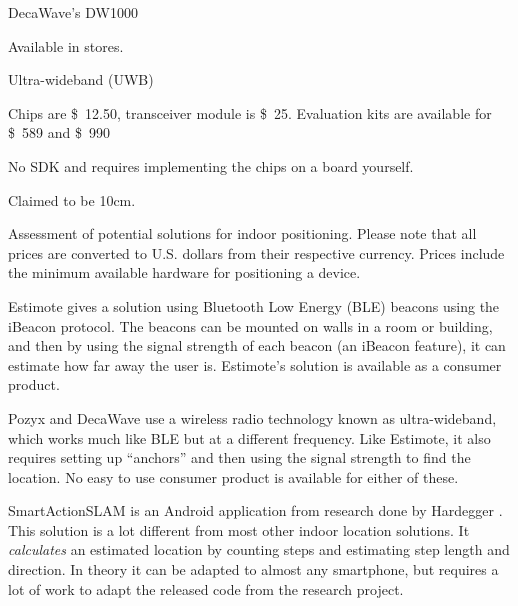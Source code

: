 \begin{table}[!htb]
\begin{description}[style=multiline,leftmargin=2.5cm]
        \item[Product:] DecaWave's DW1000 \cite{decawave}
        \item[Availability:] Available in stores. 
        \item[Technology:] Ultra-wideband (UWB)
        \item[Price:] Chips are \SI{12.50}[\$]{}, transceiver module is \SI{25}[\$]{}. Evaluation kits are available for \SI{589}[\$]{} and \SI{990}[\$]{} 
        \item[Ease of use:] No SDK and requires implementing the chips on a board yourself. 
        \item[Accuracy:] Claimed to be 10cm. 
        \end{description}
    \caption{Assessment of potential solutions for indoor positioning. Please note that all prices are converted to U.S. dollars from their respective currency. Prices include the minimum available hardware for positioning a device.}
    \label{tbl:indoor-positioning}
\end{table}

Estimote gives a solution using Bluetooth Low Energy (BLE) beacons using the iBeacon protocol. 
The beacons can be mounted on walls in a room or building, 
and then by using the signal strength of each beacon (an iBeacon feature), 
it can estimate how far away the user is. 
Estimote's solution is available as a consumer product.

Pozyx and DecaWave use a wireless radio technology known as ultra-wideband, which works much like BLE but at a different frequency. 
Like Estimote, it also requires setting up ``anchors'' and then using the signal strength to find the location. 
No easy to use consumer product is available for either of these.

SmartActionSLAM is an Android application from research done by Hardegger \etal \cite{SASLAM}. 
This solution is a lot different from most other indoor location solutions. 
It \emph{calculates} an estimated location by counting steps and estimating step length and direction. 
In theory it can be adapted to almost any smartphone, 
but requires a lot of work to adapt the released code from the research project. 


